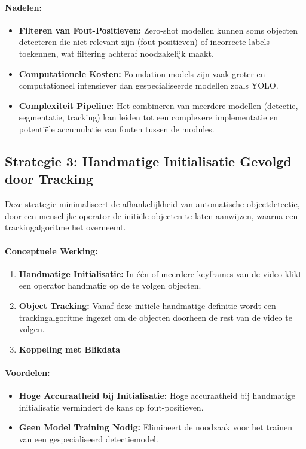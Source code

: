 \paragraph{Nadelen:}
\begin{itemize}
    \item \textbf{Filteren van Fout-Positieven:} Zero-shot modellen kunnen soms objecten detecteren die niet relevant zijn (fout-positieven) of incorrecte labels toekennen, wat filtering achteraf noodzakelijk maakt.
    \item \textbf{Computationele Kosten:} Foundation models zijn vaak groter en computationeel intensiever dan gespecialiseerde modellen zoals YOLO.
    \item \textbf{Complexiteit Pipeline:} Het combineren van meerdere modellen (detectie, segmentatie, tracking) kan leiden tot een complexere implementatie en potentiële accumulatie van fouten tussen de modules.
\end{itemize}

\subsection{Strategie 3: Handmatige Initialisatie Gevolgd door Tracking}

Deze strategie minimaliseert de afhankelijkheid van automatische objectdetectie, door een menselijke operator de initiële objecten te laten aanwijzen, waarna een trackingalgoritme het overneemt.

\paragraph{Conceptuele Werking:}
\begin{enumerate}
    \item \textbf{Handmatige Initialisatie:} In één of meerdere keyframes van de video klikt een operator handmatig op de te volgen objecten.
    \item \textbf{Object Tracking:} Vanaf deze initiële handmatige definitie wordt een trackingalgoritme ingezet om de objecten doorheen de rest van de video te volgen.
    \item \textbf{Koppeling met Blikdata}
\end{enumerate}

\paragraph{Voordelen:}
\begin{itemize}
    \item \textbf{Hoge Accuraatheid bij Initialisatie:} Hoge accuraatheid bij handmatige initialisatie vermindert de kans op fout-positieven.
    \item \textbf{Geen Model Training Nodig:} Elimineert de noodzaak voor het trainen van een gespecialiseerd detectiemodel.
\end{itemize}

